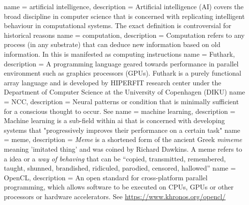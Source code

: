  {
    name = artificial intelligence,
    description = {Artificial intelligence (AI) covers the broad discipline in computer science
that is concerned with replicating intelligent behaviour in computational systems. The exact
definition is controversial for historical reasons \autocite{Nilsson2009}}
}
 {
   name = computation,
   description = {Computation refers to any process (in any
substrate) that can deduce new information based on old information. In
this is manifested as computing instructions}
}
 {
   name = {Futhark},
   description = {A programming language geared towards performance in parallel environment such as
   graphics processors (GPUs). Futhark is a purely functional array language and is
   developed by HIPERFIT research center under the Department of Computer Science at the
   University of Copenhagen (DIKU)}
}
 {
   name = {NCC},
   description = {Neural patterns or condition that is minimally sufficient for a conscious
thought to occur. See \autocite{atkinson2000, Hohwy2009}}
}
 {
  name = machine learning,
  description = {Machine learning is a sub-field within \gls{ai} that is concerned
    with developing systems that "progressively improves their performance on a
    certain task" \autocite{wiki:ml}}
}
 {
name = meme,
description = {\textit{Meme} is a shortened form of the ancient Greek \textit{mimeme} meaning
'imitated thing' and was coined by Richard Dawkins. A meme refers to a idea or a
\textit{way of behaving} that can be \enquote{copied, transmitted, remembered, taught, shunned,
brandished, ridiculed, parodied, censored, hallowed} \autocite{dennett2017}}
}
 {
   name = {OpenCL},
   description = {An open standard for cross-platform parallel programming, which
   allows software to be executed on CPUs, GPUs or other processors or hardware accelerators. See \url{
   https://www.khronos.org/opencl/}}
}
